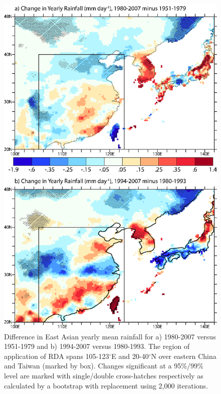 \documentclass[singlecolumn,11pt]{pnas-new}
\begin{document}
\begin{figure}
\centering
\noindent\includegraphics[width=32pc]{Figures/SFND}
\caption{Difference in East Asian yearly mean rainfall for a) 1980-2007 versus 1951-1979 and  b) 1994-2007 versus 1980-1993. The region of application of RDA spans 105-123$^{\circ}$E and 20-40$^{\circ}$N over eastern China and Taiwan (marked by box). Changes significant at a 95\%/99\% level are marked with single/double cross-hatches respectively as calculated by a bootstrap with replacement using 2,000 iterations.}
\label{fig:sfnd}
\end{figure}

\clearpage
\end{document}
